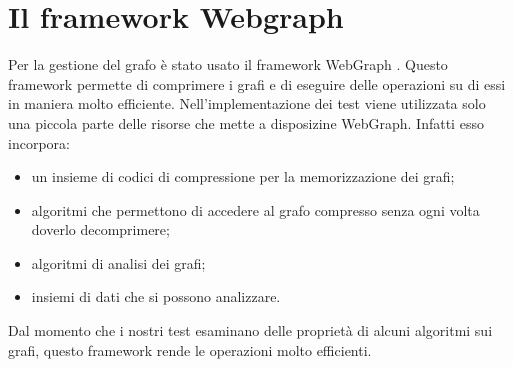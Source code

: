 \section{Il framework Webgraph}
Per la gestione del grafo è stato usato il framework WebGraph \cite{Boldi03thewebgraph}. Questo framework permette di comprimere i grafi e di eseguire delle operazioni su di essi in maniera molto efficiente. Nell'implementazione dei test viene utilizzata solo una piccola parte delle risorse che mette a disposizine WebGraph. Infatti esso incorpora:
\begin{itemize}
 \item un insieme di codici di compressione per la memorizzazione dei grafi;
 \item algoritmi che permettono di accedere al grafo compresso senza ogni volta doverlo decomprimere;
 \item algoritmi di analisi dei grafi;
 \item insiemi di dati che si possono analizzare.
\end{itemize}
Dal momento che i nostri test esaminano delle proprietà di alcuni algoritmi sui grafi, questo framework rende le operazioni molto efficienti.


